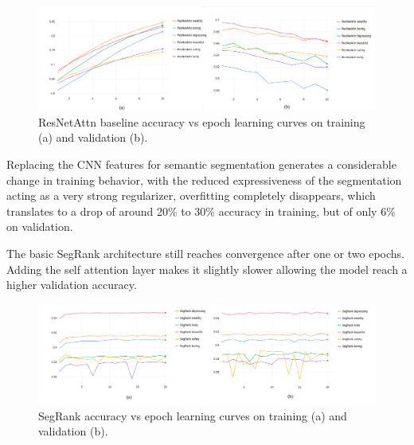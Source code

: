 \begin{figure}[ht]
	\begin{center}
	\includegraphics[width=1\textwidth]{./figures/resnet_attn_graph.png}
	\caption[ResNetAttn Training curves]{
        ResNetAttn baseline accuracy vs epoch learning curves on training (a) and validation (b).
        }
	\label{fig:resnet_attn_graph}
	\end{center}
\end{figure}

Replacing the CNN features for semantic segmentation generates a considerable change in training
behavior, with the reduced expressiveness of the segmentation acting as a very strong regularizer,
overfitting completely disappears, which translates to a drop of around 20\% to 30\% accuracy in training,
but of only 6\% on validation.

The basic SegRank architecture still reaches convergence after one or two epochs.
Adding the self attention layer makes it slightly slower allowing the model reach a higher validation accuracy.


\begin{figure}[ht]
	\begin{center}
	\includegraphics[width=1\textwidth]{./figures/segrank_graph.png}
	\caption[SegRank Training curves]{
        SegRank accuracy vs epoch learning curves on training (a) and validation (b).
        }
	\label{fig:segrank_graph}
	\end{center}
\end{figure}

